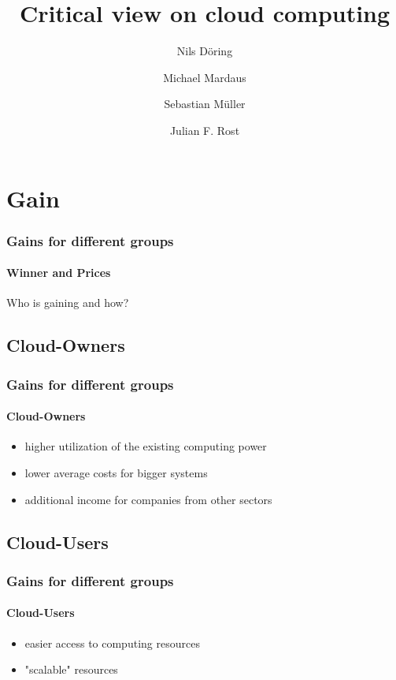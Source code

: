 \documentclass[]{beamer}
\author{Nils Döring \and Michael Mardaus  \and Sebastian Müller \and Julian F. Rost}
\title{Critical view on cloud computing}
\begin{document}
\begin{frame}
        \titlepage
\end{frame}


\section{Gain}

\begin{frame}
        \frametitle{Gains for different groups}
        \framesubtitle{Winner and Prices}
        \begin{center}
        Who is gaining and how?
        \end{center}
\end{frame}

\subsection{Cloud-Owners}

\begin{frame}
        \frametitle{Gains for different groups}
        \framesubtitle{Cloud-Owners}
        \begin{itemize}
                \item higher utilization of the existing computing power
                \item lower average costs for bigger systems
                \item additional income for companies from other sectors
        \end{itemize}
\end{frame}

\subsection{Cloud-Users}

\begin{frame}
        \frametitle{Gains for different groups}
        \framesubtitle{Cloud-Users}
        \begin{itemize}
                \item easier access to computing resources
                \item "scalable" resources
        \end{itemize}
\end{frame}
\end{document}

